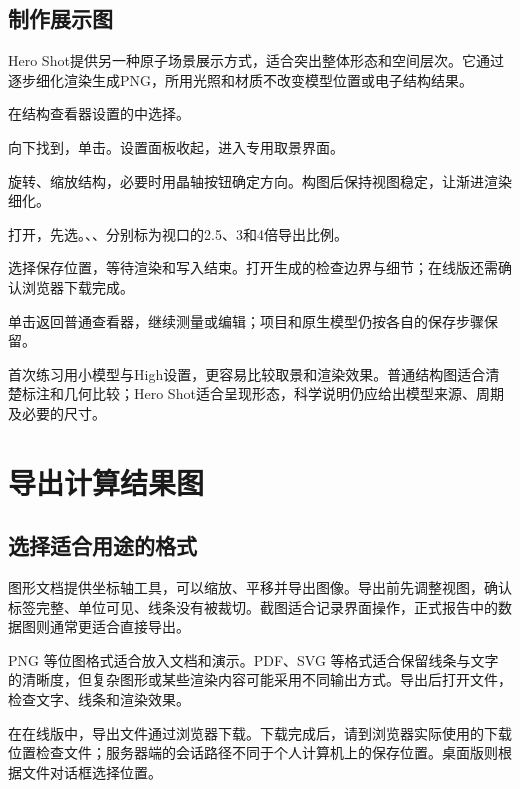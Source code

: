 \subsection{制作展示图}

Hero Shot提供另一种原子场景展示方式，适合突出整体形态和空间层次。它通过逐步细化渲染生成PNG，所用光照和材质不改变模型位置或电子结构结果。

\begin{steps}
\item 在结构查看器设置的中选择。
\item 向下找到，单击。设置面板收起，进入专用取景界面。
\item 旋转、缩放结构，必要时用晶轴按钮确定方向。构图后保持视图稳定，让渐进渲染细化。
\item 打开，先选。、、分别标为视口的2.5、3和4倍导出比例。
\item 选择保存位置，等待渲染和写入结束。打开生成的检查边界与细节；在线版还需确认浏览器下载完成。
\item 单击返回普通查看器，继续测量或编辑；项目和原生模型仍按各自的保存步骤保留。
\end{steps}

首次练习用小模型与High设置，更容易比较取景和渲染效果。普通结构图适合清楚标注和几何比较；Hero Shot适合呈现形态，科学说明仍应给出模型来源、周期及必要的尺寸。

\section{导出计算结果图}

\subsection{选择适合用途的格式}

图形文档提供坐标轴工具，可以缩放、平移并导出图像。导出前先调整视图，确认标签完整、单位可见、线条没有被裁切。截图适合记录界面操作，正式报告中的数据图则通常更适合直接导出。

PNG 等位图格式适合放入文档和演示。PDF、SVG 等格式适合保留线条与文字的清晰度，但复杂图形或某些渲染内容可能采用不同输出方式。导出后打开文件，检查文字、线条和渲染效果。

在在线版中，导出文件通过浏览器下载。下载完成后，请到浏览器实际使用的下载位置检查文件；服务器端的会话路径不同于个人计算机上的保存位置。桌面版则根据文件对话框选择位置。

